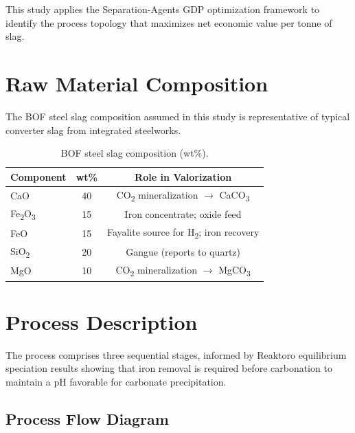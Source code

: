 \documentclass[11pt,a4paper]{article}
\begin{document}
This study applies the Separation-Agents GDP optimization framework to identify the
process topology that maximizes net economic value per tonne of slag.

\section{Raw Material Composition}

The BOF steel slag composition assumed in this study is representative of typical
converter slag from integrated steelworks.

\begin{table}[H]
\centering
\caption{BOF steel slag composition (wt\%).}
\label{tab:composition}
\begin{tabular}{@{}lcc@{}}
\toprule
\textbf{Component} & \textbf{wt\%} & \textbf{Role in Valorization} \\
\midrule
CaO                & 40 & CO\textsubscript{2} mineralization $\to$ CaCO\textsubscript{3} \\
Fe\textsubscript{2}O\textsubscript{3} & 15 & Iron concentrate; oxide feed \\
FeO                & 15 & Fayalite source for H\textsubscript{2}; iron recovery \\
SiO\textsubscript{2} & 20 & Gangue (reports to quartz) \\
MgO                & 10 & CO\textsubscript{2} mineralization $\to$ MgCO\textsubscript{3} \\
\bottomrule
\end{tabular}
\end{table}

\section{Process Description}

The process comprises three sequential stages, informed by Reaktoro
equilibrium speciation results showing that iron removal is required
before carbonation to maintain a pH favorable for carbonate precipitation.

\subsection{Process Flow Diagram}
\end{document}
